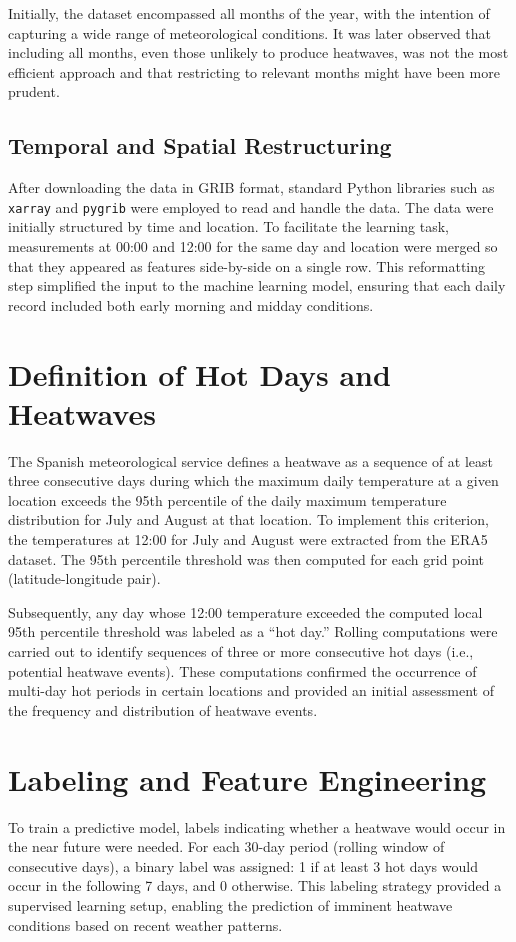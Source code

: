 \documentclass[8pt,a4paper]{article}
\begin{document}
Initially, the dataset encompassed all months of the year, with the intention of capturing a wide range of meteorological conditions. It was later observed that including all months, even those unlikely to produce heatwaves, was not the most efficient approach and that restricting to relevant months might have been more prudent.

\subsection{Temporal and Spatial Restructuring}
After downloading the data in GRIB format, standard Python libraries such as \texttt{xarray} and \texttt{pygrib} were employed to read and handle the data. The data were initially structured by time and location. To facilitate the learning task, measurements at 00:00 and 12:00 for the same day and location were merged so that they appeared as features side-by-side on a single row. This reformatting step simplified the input to the machine learning model, ensuring that each daily record included both early morning and midday conditions.

\section{Definition of Hot Days and Heatwaves}
The Spanish meteorological service defines a heatwave as a sequence of at least three consecutive days during which the maximum daily temperature at a given location exceeds the 95th percentile of the daily maximum temperature distribution for July and August at that location. To implement this criterion, the temperatures at 12:00 for July and August were extracted from the ERA5 dataset. The 95th percentile threshold was then computed for each grid point (latitude-longitude pair).

Subsequently, any day whose 12:00 temperature exceeded the computed local 95th percentile threshold was labeled as a ``hot day.'' Rolling computations were carried out to identify sequences of three or more consecutive hot days (i.e., potential heatwave events). These computations confirmed the occurrence of multi-day hot periods in certain locations and provided an initial assessment of the frequency and distribution of heatwave events.

\section{Labeling and Feature Engineering}
To train a predictive model, labels indicating whether a heatwave would occur in the near future were needed. For each 30-day period (rolling window of consecutive days), a binary label was assigned: 1 if at least 3 hot days would occur in the following 7 days, and 0 otherwise. This labeling strategy provided a supervised learning setup, enabling the prediction of imminent heatwave conditions based on recent weather patterns.
\end{document}

